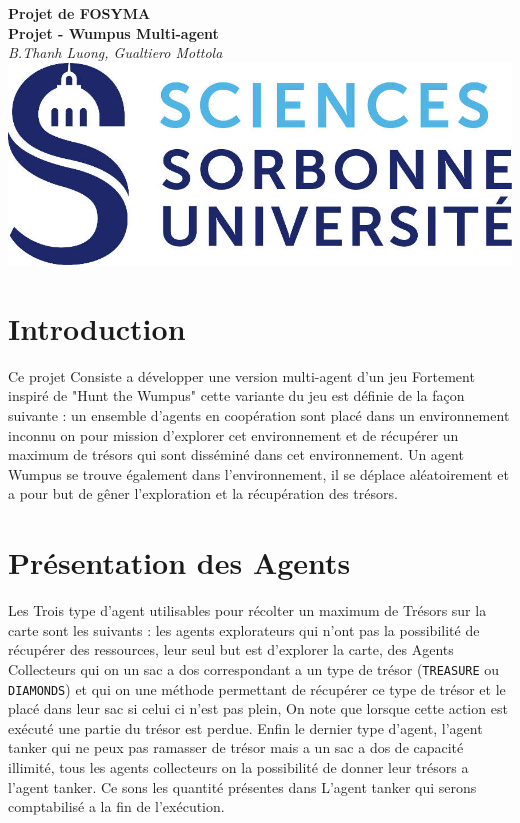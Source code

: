 \documentclass[10pt]{article}
\begin{document}
	
\begin{center}
	\textbf{Projet de FOSYMA\\[.5cm]Projet - Wumpus Multi-agent}\\[.5cm]
	\textit{B.Thanh Luong, Gualtiero Mottola}\\
	
	\includegraphics{logo}

\end{center}

\tableofcontents

\section{Introduction}
	Ce projet Consiste a développer une version multi-agent d'un jeu Fortement inspiré de "Hunt the Wumpus"  cette variante du jeu est définie de la façon suivante : un ensemble d'agents en coopération sont placé dans un environnement inconnu on pour mission d'explorer cet environnement et de récupérer un maximum de trésors qui sont disséminé dans cet environnement. Un agent Wumpus se trouve également dans l'environnement, il se déplace aléatoirement et a pour but de gêner l'exploration et la récupération des trésors.
	
\section{Présentation des Agents}
	Les Trois type d'agent utilisables pour récolter un maximum de Trésors sur la carte sont les suivants : les agents explorateurs qui n'ont pas la possibilité de récupérer des ressources, leur seul but est d'explorer la carte, des Agents Collecteurs qui on un sac a dos correspondant a un type de trésor (\texttt{TREASURE} ou \texttt{DIAMONDS}) et qui on une méthode permettant de récupérer ce type de trésor et le placé dans leur sac si celui ci n'est pas plein, On note que lorsque cette action est exécuté une partie du trésor est perdue. Enfin le dernier type d'agent, l'agent tanker qui ne peux pas ramasser de trésor mais a un sac a dos de capacité illimité, tous les agents collecteurs on la possibilité de donner leur trésors a l'agent tanker. Ce sons les quantité présentes dans L'agent tanker qui serons comptabilisé a la fin de l'exécution.
\end{document}
